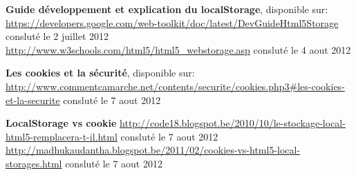 \begin{thebibliography}{99}
\bibitem{}\textbf{Guide développement et explication du localStorage}, disponible sur: \newline
\url{https://developers.google.com/web-toolkit/doc/latest/DevGuideHtml5Storage} consluté le 2 juillet 2012 \\
\url{http://www.w3schools.com/html5/html5_webstorage.asp} consluté le 4 aout 2012

\bibitem{}\textbf{Les cookies et la sécurité}, disponible sur: \newline
\url{http://www.commentcamarche.net/contents/securite/cookies.php3#les-cookies-et-la-securite} consluté le 7 aout 2012 

\bibitem{}\textbf{LocalStorage vs cookie} \newline
\url{http://code18.blogspot.be/2010/10/le-stockage-local-html5-remplacera-t-il.html} consluté le 7 aout 2012
\url{http://madhukaudantha.blogspot.be/2011/02/cookies-vs-html5-local-storages.html} consluté le 7 aout 2012

\end{thebibliography} 
